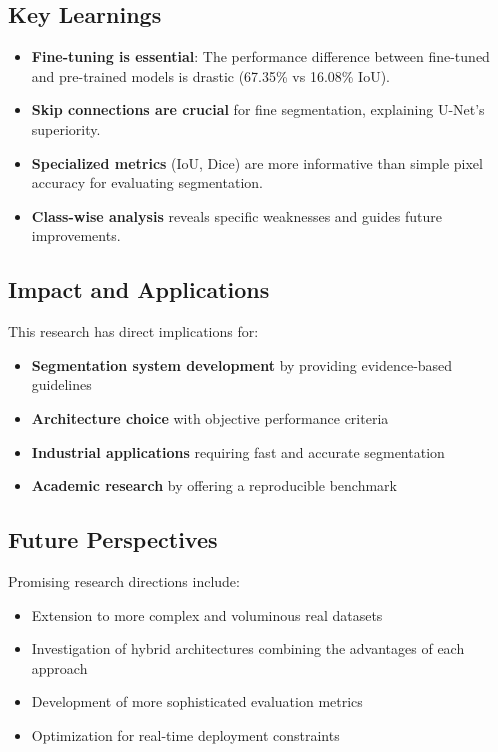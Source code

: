 \documentclass[12pt,a4paper]{article}
\begin{document}
\subsection{Key Learnings}

\begin{itemize}
    \item \textbf{Fine-tuning is essential}: The performance difference between fine-tuned and pre-trained models is drastic (67.35\% vs 16.08\% IoU).
    \item \textbf{Skip connections are crucial} for fine segmentation, explaining U-Net's superiority.
    \item \textbf{Specialized metrics} (IoU, Dice) are more informative than simple pixel accuracy for evaluating segmentation.
    \item \textbf{Class-wise analysis} reveals specific weaknesses and guides future improvements.
\end{itemize}

\subsection{Impact and Applications}

This research has direct implications for:
\begin{itemize}
    \item \textbf{Segmentation system development} by providing evidence-based guidelines
    \item \textbf{Architecture choice} with objective performance criteria
    \item \textbf{Industrial applications} requiring fast and accurate segmentation
    \item \textbf{Academic research} by offering a reproducible benchmark
\end{itemize}

\subsection{Future Perspectives}

Promising research directions include:
\begin{itemize}
    \item Extension to more complex and voluminous real datasets
    \item Investigation of hybrid architectures combining the advantages of each approach
    \item Development of more sophisticated evaluation metrics
    \item Optimization for real-time deployment constraints
\end{itemize}
\end{document}
